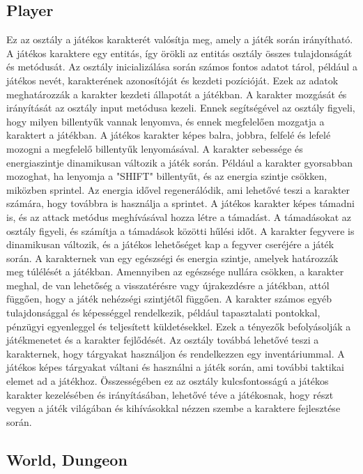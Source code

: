                     \subsection{Player}
Ez az osztály a játékos karakterét valósítja meg, amely a játék során irányítható. A játékos karaktere egy entitás, így örökli az entitás osztály összes tulajdonságát és metódusát. Az osztály inicializálása során számos fontos adatot tárol, például a játékos nevét, karakterének azonosítóját és kezdeti pozícióját. Ezek az adatok meghatározzák a karakter kezdeti állapotát a játékban. A karakter mozgását és irányítását az osztály input metódusa kezeli. Ennek segítségével az osztály figyeli, hogy milyen billentyűk vannak lenyomva, és ennek megfelelően mozgatja a karaktert a játékban. A játékos karakter képes balra, jobbra, felfelé és lefelé mozogni a megfelelő billentyűk lenyomásával. A karakter sebessége és energiaszintje dinamikusan változik a játék során. Például a karakter gyorsabban mozoghat, ha lenyomja a "SHIFT" billentyűt, és az energia szintje csökken, miközben sprintel. Az energia idővel regenerálódik, ami lehetővé teszi a karakter számára, hogy továbbra is használja a sprintet. A játékos karakter képes támadni is, és az attack metódus meghívásával hozza létre a támadást. A támadásokat az osztály figyeli, és számítja a támadások közötti hűlési időt. A karakter fegyvere is dinamikusan változik, és a játékos lehetőséget kap a fegyver cseréjére a játék során. A karakternek van egy egészségi és energia szintje, amelyek határozzák meg túlélését a játékban. Amennyiben az egészsége nullára csökken, a karakter meghal, de van lehetőség a visszatérésre vagy újrakezdésre a játékban, attól függően, hogy a játék nehézségi szintjétől függően. A karakter számos egyéb tulajdonsággal és képességgel rendelkezik, például tapasztalati pontokkal, pénzügyi egyenleggel és teljesített küldetésekkel. Ezek a tényezők befolyásolják a játékmenetet és a karakter fejlődését. Az osztály továbbá lehetővé teszi a karakternek, hogy tárgyakat használjon és rendelkezzen egy inventáriummal. A játékos képes tárgyakat váltani és használni a játék során, ami további taktikai elemet ad a játékhoz. Összességében ez az osztály kulcsfontosságú a játékos karakter kezelésében és irányításában, lehetővé téve a játékosnak, hogy részt vegyen a játék világában és kihívásokkal nézzen szembe a karaktere fejlesztése során.
\subsection{World, Dungeon}

